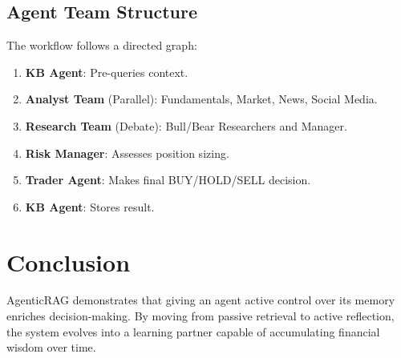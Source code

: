 \documentclass[11pt, a4paper]{article}
\begin{document}
\subsection{Agent Team Structure}
The workflow follows a directed graph:
\begin{enumerate}
    \item \textbf{KB Agent}: Pre-queries context.
    \item \textbf{Analyst Team} (Parallel): Fundamentals, Market, News, Social Media.
    \item \textbf{Research Team} (Debate): Bull/Bear Researchers and Manager.
    \item \textbf{Risk Manager}: Assesses position sizing.
    \item \textbf{Trader Agent}: Makes final BUY/HOLD/SELL decision.
    \item \textbf{KB Agent}: Stores result.
\end{enumerate}

\section{Conclusion}
AgenticRAG demonstrates that giving an agent active control over its memory enriches decision-making. By moving from passive retrieval to active reflection, the system evolves into a learning partner capable of accumulating financial wisdom over time.
\end{document}
